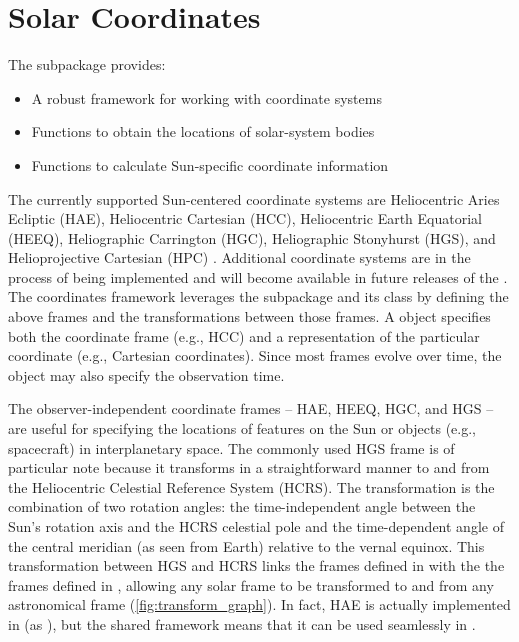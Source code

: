 \section{Solar Coordinates}
\label{sec:coords}

The  subpackage provides:
\begin{itemize}
    \item A robust framework for working with coordinate systems
    \item Functions to obtain the locations of solar-system bodies
    \item Functions to calculate Sun-specific coordinate information
\end{itemize}
The currently supported Sun-centered coordinate systems are Heliocentric Aries Ecliptic (HAE), Heliocentric Cartesian (HCC), Heliocentric Earth Equatorial (HEEQ), Heliographic Carrington (HGC), Heliographic Stonyhurst (HGS), and Helioprojective Cartesian (HPC) \citep[see][]{2006A&A...449..791T}.
Additional coordinate systems are in the process of being implemented and will become available in future releases of the \sunpypkg.
The coordinates framework leverages the  subpackage and its  class \citep[see Section 3.3 of][]{astropy2018} by defining the above frames and the transformations between those frames.
A  object specifies both the coordinate frame (e.g., HCC) and a representation of the particular coordinate (e.g., Cartesian coordinates).
Since most frames evolve over time, the  object may also specify the observation time.

The observer-independent coordinate frames -- HAE, HEEQ, HGC, and HGS -- are useful for specifying the locations of features on the Sun or objects (e.g., spacecraft) in interplanetary space.
The commonly used HGS frame is of particular note because it transforms in a straightforward manner to and from the Heliocentric Celestial Reference System (HCRS).
The transformation is the combination of two rotation angles: the time-independent angle between the Sun's rotation axis and the HCRS celestial pole \citep[see][]{2007CeMDA..98..155S} and the time-dependent angle of the central meridian (as seen from Earth) relative to the vernal equinox.
This transformation between HGS and HCRS links the frames defined in  with the the frames defined in , allowing any solar frame to be transformed to and from any astronomical frame (\autoref{fig:transform_graph}).
In fact, HAE is actually implemented in  (as ), but the shared framework means that it can be used seamlessly in \sunpypkg.

